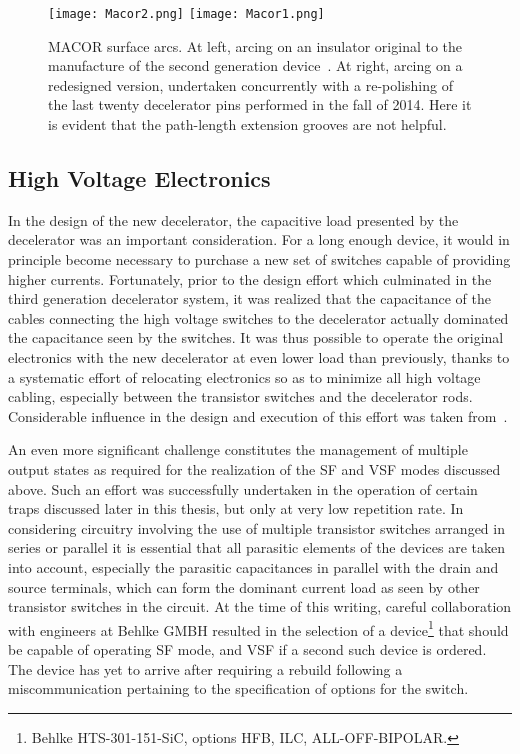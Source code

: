 \begin{figure}[t!]
\centering
\vspace{1mm}
\texttt{[image: Macor2.png]}
\texttt{[image: Macor1.png]}
\caption[MACOR Surface Arcs]{\label{macorbad}
MACOR surface arcs. At left, arcing on an insulator original to the manufacture of the second generation device~\cite{Sawyer2007}. At right, arcing on a redesigned version, undertaken concurrently with a re-polishing of the last twenty decelerator pins performed in the fall of 2014. Here it is evident that the path-length extension grooves are not helpful.}
\end{figure}

\subsection{High Voltage Electronics}

In the design of the new decelerator, the capacitive load presented by the decelerator was an important consideration.
For a long enough device, it would in principle become necessary to purchase a new set of switches capable of providing higher currents.
Fortunately, prior to the design effort which culminated in the third generation decelerator system, it was realized that the capacitance of the cables connecting the high voltage switches to the decelerator actually dominated the capacitance seen by the switches.
It was thus possible to operate the original electronics with the new decelerator at even lower load than previously, thanks to a systematic effort of relocating electronics so as to minimize all high voltage cabling, especially between the transistor switches and the decelerator rods.
Considerable influence in the design and execution of this effort was taken from~\citep[Fig.~4.6]{Scharfenberg2012}.

An even more significant challenge constitutes the management of multiple output states as required for the realization of the SF and VSF modes discussed above. 
Such an effort was successfully undertaken in the operation of certain traps discussed later in this thesis, but only at very low repetition rate.
In considering circuitry involving the use of multiple transistor switches arranged in series or parallel it is essential that all parasitic elements of the devices are taken into account, especially the parasitic capacitances in parallel with the drain and source terminals, which can form the dominant current load as seen by other transistor switches in the circuit.
At the time of this writing, careful collaboration with engineers at Behlke GMBH resulted in the selection of a device\footnote{Behlke HTS-301-151-SiC, options HFB, ILC, ALL-OFF-BIPOLAR.} that should be capable of operating SF mode, and VSF if a second such device is ordered. 
The device has yet to arrive after requiring a rebuild following a miscommunication pertaining to the specification of options for the switch.

